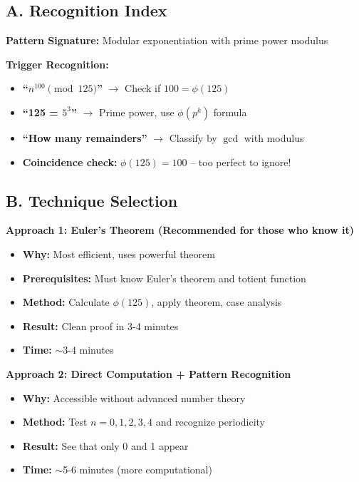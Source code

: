 \documentclass[12pt]{article}
\begin{document}
\begin{techniquesbox}
\subsection*{A. Recognition Index}

\textbf{Pattern Signature:} Modular exponentiation with prime power modulus

\textbf{Trigger Recognition:}
\begin{itemize}
    \item \textbf{``$n^{100} \pmod{125}$''} $\to$ Check if $100 = \phi(125)$
    \item \textbf{``125 = $5^3$''} $\to$ Prime power, use $\phi(p^k)$ formula
    \item \textbf{``How many remainders''} $\to$ Classify by $\gcd$ with modulus
    \item \textbf{Coincidence check:} $\phi(125) = 100$ -- too perfect to ignore!
\end{itemize}

\subsection*{B. Technique Selection}

\textbf{Approach 1: Euler's Theorem (Recommended for those who know it)}
\begin{itemize}
    \item \textbf{Why:} Most efficient, uses powerful theorem
    \item \textbf{Prerequisites:} Must know Euler's theorem and totient function
    \item \textbf{Method:} Calculate $\phi(125)$, apply theorem, case analysis
    \item \textbf{Result:} Clean proof in 3-4 minutes
    \item \textbf{Time:} $\sim$3-4 minutes
\end{itemize}

\textbf{Approach 2: Direct Computation + Pattern Recognition}
\begin{itemize}
    \item \textbf{Why:} Accessible without advanced number theory
    \item \textbf{Method:} Test $n = 0, 1, 2, 3, 4$ and recognize periodicity
    \item \textbf{Result:} See that only 0 and 1 appear
    \item \textbf{Time:} $\sim$5-6 minutes (more computational)
\end{itemize}


\end{techniquesbox}
\end{document}
